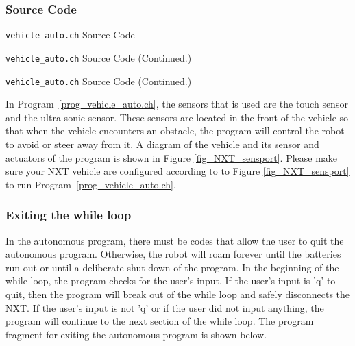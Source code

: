 \documentclass[11pt]{article}
\begin{document}
\subsubsection*{Source Code}

\begin{Program}[H]
    {\small}
    \caption{\texttt{vehicle\_auto.ch} Source Code\label{prog_vehicle_auto.ch}}
\end{Program}
\addtocounter{Program}{-1}
\begin{Program}[H]
    {\small}
    \caption{\texttt{vehicle\_auto.ch} Source Code (Continued.)\label{prog_vehicle_auto.ch}}
\end{Program}
\addtocounter{Program}{-1}
\begin{Program}[H]
    {\small}
    \caption{\texttt{vehicle\_auto.ch} Source Code (Continued.)\label{prog_vehicle_auto.ch}}
\end{Program}

In Program~\ref{prog_vehicle_auto.ch}, the sensors that is used are the touch sensor and the ultra sonic sensor.
These sensors are located in the front of the vehicle so that when the vehicle encounters an obstacle, the program will
control the robot to avoid or steer away from it. A diagram of the vehicle and its sensor and actuators of the program 
is shown in Figure \ref{fig_NXT_sensport}. Please make sure your NXT vehicle are configured according to to Figure 
\ref{fig_NXT_sensport} to run Program~\ref{prog_vehicle_auto.ch}.

\subsubsection*{Exiting the while loop}
In the autonomous program, there must be codes that allow the user to quit the autonomous program.
Otherwise, the robot will roam forever until the batteries run out or until a deliberate shut down of the program.
In the beginning of the while loop, the program checks for the user's input. 
If the user's input is 'q' to quit, then the program will break out of the while loop and safely disconnects the NXT.
If the user's input is not 'q' or if the user did not input anything, the program will continue to the next section of
the while loop. The program fragment for exiting the autonomous program is shown below.
\end{document}
